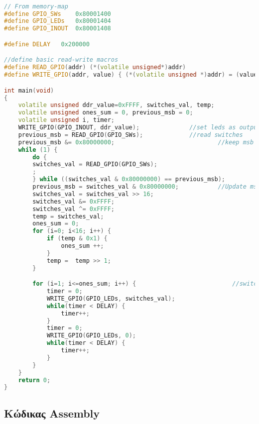 \documentclass[a4paper]{article}
\begin{document}
\begin{lstlisting}[language=C++, keywordstyle=\color{red}, basicstyle=\small]

// From memory-map
#define GPIO_SWs    0x80001400
#define GPIO_LEDs   0x80001404
#define GPIO_INOUT  0x80001408

#define DELAY   0x200000

//define basic read-write macros
#define READ_GPIO(addr) (*(volatile unsigned*)addr)
#define WRITE_GPIO(addr, value) { (*(volatile unsigned *)addr) = (value);}

int main(void) 
{
    volatile unsigned ddr_value=0xFFFF, switches_val, temp; 
    volatile unsigned ones_sum = 0, previous_msb = 0;
    volatile unsigned i, timer;
    WRITE_GPIO(GPIO_INOUT, ddr_value);				//set leds as output
    previous_msb = READ_GPIO(GPIO_SWs); 			//read switches
    previous_msb &= 0x80000000;								//keep msb for comparison
    while (1) {
        do {															//continue reading untill msb changes
        switches_val = READ_GPIO(GPIO_SWs);
        ;
        } while ((switches_val & 0x80000000) == previous_msb);	
        previous_msb = switches_val & 0x80000000;			//Update msbit 
        switches_val = switches_val >> 16;
        switches_val &= 0xFFFF;
        switches_val ^= 0xFFFF; 											//flip bits using XOR
        temp = switches_val;
        ones_sum = 0;
        for (i=0; i<16; i++) {												//shift and count 1-bits
            if (temp & 0x1) {
                ones_sum ++;
            }
            temp =  temp >> 1;
        }

        for (i=1; i<=ones_sum; i++) {							//switch ON and OFF with delay
            timer = 0;
            WRITE_GPIO(GPIO_LEDs, switches_val);
            while(timer < DELAY) {
                timer++;
            }
            timer = 0;
            WRITE_GPIO(GPIO_LEDs, 0);
            while(timer < DELAY) {
                timer++;
            }
        }
    }
    return 0;
}
\end{lstlisting}

\subsection*{Κώδικας Assembly}
\end{document}
